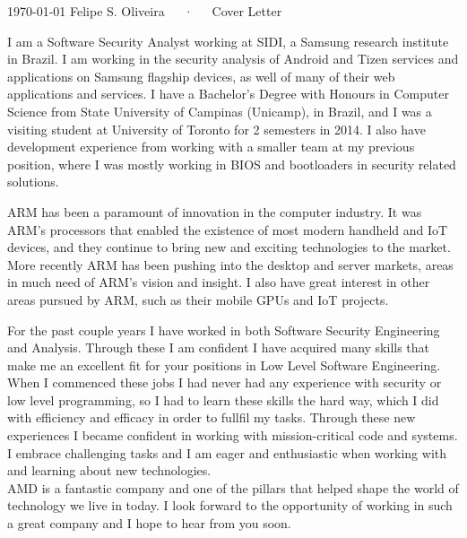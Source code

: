 \documentclass[11pt, a4paper]{awesome-cv}
\begin{document}
\makecvheader[R]

\makecvfooter
  {\today}
  {Felipe S. Oliveira~~~·~~~Cover Letter}
  {}

\makelettertitle

\begin{cvletter}

I am a Software Security Analyst working at SIDI, a Samsung research institute in Brazil. I am working in the security analysis of Android and Tizen services and applications on Samsung flagship devices, as well of many of their web applications and services. I have a Bachelor's Degree with Honours in Computer Science from State University of Campinas (Unicamp), in Brazil, and I was a visiting student at University of Toronto for 2 semesters in 2014. I also have development experience from working with a smaller team at my previous position, where I was mostly working in BIOS and bootloaders in security related solutions.

ARM has been a paramount of innovation in the computer industry. It was ARM's processors that enabled the existence of most modern handheld and IoT devices, and they continue to bring new and exciting technologies to the market. More recently ARM has been pushing into the desktop and server markets, areas in much need of ARM's vision and insight. I also have great interest in other areas pursued by ARM, such as their mobile GPUs and IoT projects.

For the past couple years I have worked in both Software Security Engineering and Analysis. Through these I am confident I have acquired many skills that make me an excellent fit for your positions in Low Level Software Engineering. When I commenced these jobs I had never had any experience with security or low level programming, so I had to learn these skills the hard way, which I did with efficiency and efficacy in order to fullfil my tasks. Through these new experiences I became confident in working with mission-critical code and systems. I embrace challenging tasks and I am eager and enthusiastic when working with and learning about new technologies. \\

AMD is a fantastic company and one of the pillars that helped shape the world of technology we live in today. I look forward to the opportunity of working in such a great company and I hope to hear from you soon.

\end{cvletter}

\makeletterclosing
\end{document}
